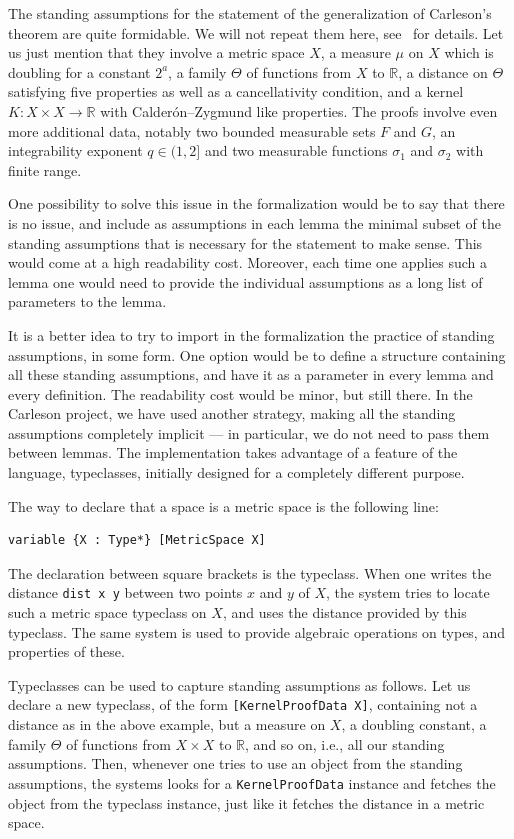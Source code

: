 \documentclass[12pt]{amsart}
\newcommand*{\real}{\mathbb{R}} %
\begin{document}
The standing assumptions for the statement of the generalization of
Carleson's theorem are quite formidable. We will not repeat them here,
see~\cite[Theorem~1.1.1]{CarlesonBlueprint} for details. Let us just mention
that they involve a metric space $X$, a measure $\mu$ on $X$ which is
doubling for a constant $2^a$, a family $\Theta$ of functions from $X$ to
$\real$, a distance on $\Theta$ satisfying five properties as well as a
cancellativity condition, and a kernel $K\colon X \times X \to \real$ with
Calderón--Zygmund like properties. The proofs involve even more additional
data, notably two bounded measurable sets $F$ and $G$, an integrability
exponent $q \in (1, 2]$ and two measurable functions $\sigma_1$ and
$\sigma_2$ with finite range.

One possibility to solve this issue in the formalization would be to say that
there is no issue, and include as assumptions in each lemma the minimal
subset of the standing assumptions that is necessary for the statement to
make sense. This would come at a high readability cost. Moreover, each time
one applies such a lemma one would need to provide the individual assumptions
as a long list of parameters to the lemma.

It is a better idea to try to import in the formalization the practice of
standing assumptions, in some form. One option would be to define a
structure containing all these standing assumptions, and have it as a
parameter in every lemma and every definition. The readability cost would be
minor, but still there. In the Carleson project, we have used another
strategy, making all the standing assumptions completely implicit --- in
particular, we do not need to pass them between lemmas. The implementation
takes advantage of a feature of the language, typeclasses, initially designed
for a completely different purpose.

The way to declare that a space is a metric space is the following line:
\begin{verbatim}
variable {X : Type*} [MetricSpace X]
\end{verbatim}
The declaration between square brackets is the typeclass. When one writes the
distance \texttt{dist x y} between two points $x$ and $y$ of $X$, the system
tries to locate such a metric space typeclass on $X$, and uses the distance
provided by this typeclass. The same system is used to provide algebraic
operations on types, and properties of these.

Typeclasses can be used to capture standing assumptions as
follows. Let us declare a new typeclass, of the form \texttt{[KernelProofData
X]}, containing not a distance as in the above example, but a measure on $X$,
a doubling constant, a family $\Theta$ of functions from $X \times X$ to
$\real$, and so on, i.e., all our standing assumptions. Then, whenever one
tries to use an object from the standing assumptions, the systems looks for a
\texttt{KernelProofData} instance and fetches the object from the typeclass
instance, just like it fetches the distance in a metric space.
\end{document}
